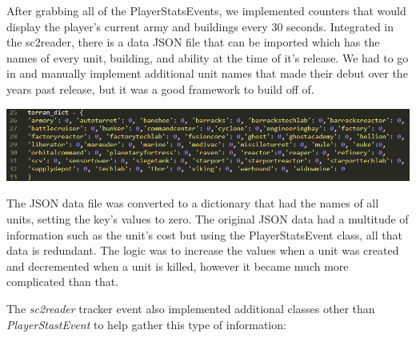 \documentclass[a4paper,12pt]{report}
\begin{document}
After grabbing all of the PlayerStatsEvents, we implemented counters that would display the player’s current army and buildings every 30 seconds. Integrated in the sc2reader, there is a data JSON file that can be imported which has the names of every unit, building, and ability at the time of it’s release. We had to go in and manually implement additional unit names that made their debut over the years past release, but it was a good framework to build off of. 

\begin{center}
    \captionsetup{type=figure}
    \includegraphics[width=.9\linewidth]{media/Terran_dict.png}
\end{center}

The JSON data file was converted to a dictionary that had the names of all units, setting the key’s values to zero. The original JSON data had a multitude of information such as the unit’s cost but using the PlayerStatsEvent class, all that data is redundant. The logic was to increase the values when a unit was created and decremented when a unit is killed, however it became much more complicated than that. 

The \textit{sc2reader} tracker event also implemented additional classes other than \textit{PlayerStastEvent} to help gather this type of information:
\end{document}

